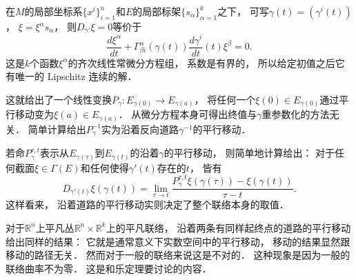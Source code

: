 在$M$的局部坐标系$\{x^i\}_{i=1}^n$和$E$的局部标架$\{s_{\alpha}\}_{\alpha=1}^k$之下， 可写$\gamma(t)=(\gamma^i(t))$， $\xi=\xi^\alpha s_\alpha$， 则$D_{\gamma'}\xi=0$等价于
$$
\frac{d\xi^\alpha}{dt}+\Gamma_{\beta i}^\alpha(\gamma(t))\frac{d\gamma^i}{dt}(t)\xi^\beta=0.
$$
这是$k$个函数$\xi^\alpha$的齐次线性常微分方程组， 系数是有界的， 所以给定初值之后它有唯一的 Lipschitz 连续的解． 

这就给出了一个线性变换$P_{\gamma}:E_{\gamma(0)}\to E_{\gamma(a)}$， 将任何一个$\xi(0)\in E_{\gamma(0)}$通过平行移动变为$\xi(a)\in E_{\gamma(a)}$． 从微分方程本身可得出终值与$\gamma$重参数化的方法无关． 简单计算给出$P_\gamma^{-1}$实为沿着反向道路$\gamma^{-1}$的平行移动． 

若命$P_\gamma^{\tau,t}$表示从$E_{\gamma(\tau)}$到$E_{\gamma(t)}$的沿着$\gamma$的平行移动， 则简单地计算给出： 对于任何截面$\xi\in\Gamma(E)$和任何使得$\gamma'(t)$存在的$t$， 皆有
$$
D_{\gamma'(t)}\xi(\gamma(t))=\lim_{\tau\to t}\frac{P_\gamma^{\tau,t}\xi(\gamma(\tau))-\xi(\gamma(t))}{\tau-t}.
$$
这样看来， 沿着道路的平行移动实则决定了整个联络本身的取值．

对于$\mathbb{R}^n$上平凡丛$\mathbb{R}^n\times\mathbb{R}^k$上的平凡联络， 沿着两条有同样起终点的道路的平行移动给出同样的结果： 它就是通常意义下实数空间中的平行移动， 移动的结果显然跟移动的路径无关． 然而对于一般的联络来说这是不对的． 这种现象是因为一般的联络曲率不为零． 这是和乐定理要讨论的内容．
